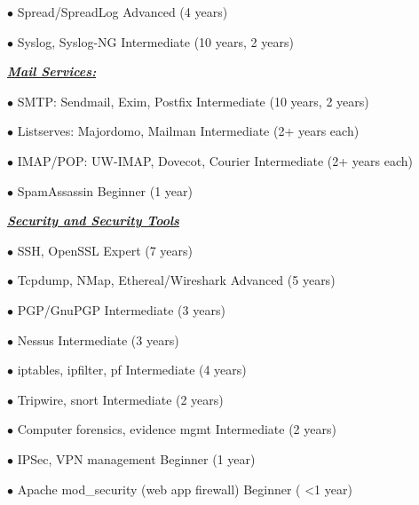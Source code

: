 \documentclass{article}
\newcommand{\skillset}[1]{{ \underline{\textbf{\emph{#1}}}\\  \nopagebreak }}
\newcommand{\skill}[2]{{$\bullet$ #1 \hfill #2 }}
\begin{document}
\skill{Spread/SpreadLog}{Advanced (4 years)}

\skill{Syslog, Syslog-NG}{Intermediate (10 years, 2 years)}




\skillset{Mail Services:}

\skill{SMTP: Sendmail, Exim, Postfix}{Intermediate (10 years, 2 years)}

\skill{Listserves: Majordomo, Mailman}{Intermediate (2+ years each)}

\skill{IMAP/POP: UW-IMAP, Dovecot, Courier}{Intermediate (2+ years each)}

\skill{SpamAssassin}{Beginner (1 year)}


\skillset{Security and Security Tools}

\skill{SSH, OpenSSL}{Expert (7 years)}

\skill{Tcpdump, NMap, Ethereal/Wireshark}{Advanced (5 years)}

\skill{PGP/GnuPGP}{Intermediate (3 years)}

\skill{Nessus}{Intermediate (3 years)}

\skill{iptables, ipfilter, pf}{Intermediate (4 years)}

\skill{Tripwire, snort}{Intermediate (2 years)}

\skill{Computer forensics, evidence mgmt}{Intermediate (2 years)}

\skill{IPSec, VPN management}{Beginner (1 year)}

\skill{Apache mod\_security (web app firewall)}{Beginner ( \textless 1 year)}
\end{document}
